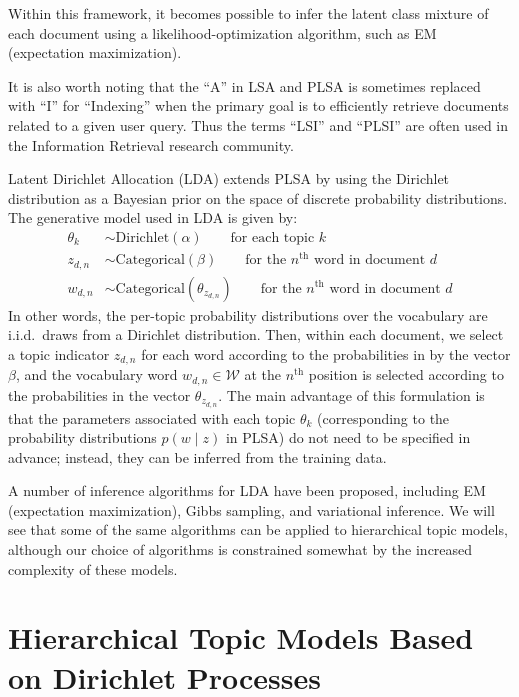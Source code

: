 \documentclass{article}
\newcommand{\nth}{^{\text{th}}}
\begin{document}
Within this framework, it becomes possible to infer the latent class mixture of each document using a likelihood-optimization algorithm, such as EM (expectation maximization).

It is also worth noting that the ``A'' in LSA and PLSA is sometimes replaced with ``I'' for ``Indexing'' when the primary goal is to efficiently retrieve documents related to a given user query.
Thus the terms ``LSI'' and ``PLSI'' are often used in the Information Retrieval research community.

Latent Dirichlet Allocation (LDA) extends PLSA by using the Dirichlet distribution as a Bayesian prior on the space of discrete probability distributions.
The generative model used in LDA is given by:
\begin{align*}
\theta_k &\sim \text{Dirichlet}(\alpha) \qquad \text{for each topic $k$} \\
z_{d,n} &\sim \text{Categorical}(\beta) \qquad \text{for the $n\nth$ word in document $d$} \\
w_{d,n} &\sim \text{Categorical}(\theta_{z_{d,n}}) \qquad \text{for the $n\nth$ word in document $d$}
\end{align*}
In other words, the per-topic probability distributions over the vocabulary are i.i.d.\ draws from a Dirichlet distribution.
Then, within each document, we select a topic indicator $z_{d,n}$ for each word according to the probabilities in by the vector $\beta$, and the vocabulary word $w_{d,n} \in \mathcal W$ at the $n\nth$ position is selected according to the probabilities in the vector $\theta_{z_{d,n}}$.
The main advantage of this formulation is that the parameters associated with each topic $\theta_k$ (corresponding to the probability distributions $p(w \mid z)$ in PLSA) do not need to be specified in advance;
instead, they can be inferred from the training data.

A number of inference algorithms for LDA have been proposed, including EM (expectation maximization), Gibbs sampling, and variational inference.
We will see that some of the same algorithms can be applied to hierarchical topic models, although our choice of algorithms is constrained somewhat by the increased complexity of these models.

\section{Hierarchical Topic Models Based on Dirichlet Processes}
\end{document}
